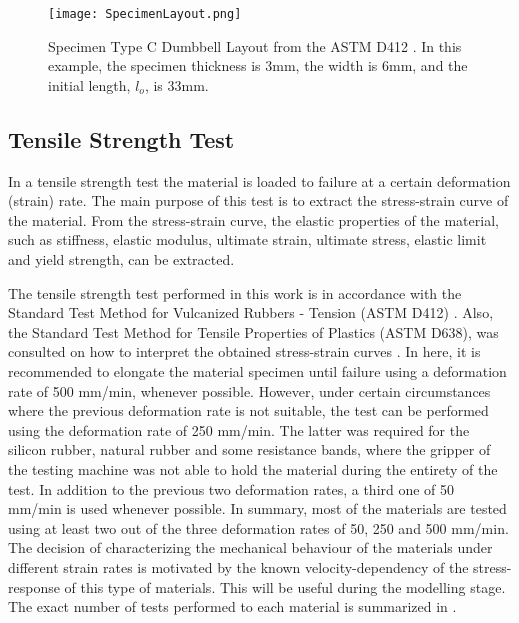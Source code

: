 \begin{figure}[htb!]
    \centering
    \texttt{[image: SpecimenLayout.png]}
    \caption{Specimen Type C Dumbbell Layout from the ASTM D412 \cite{astmd412}. In this example, the specimen thickness is 3mm, the width is 6mm, and the initial length, $l_o$, is 33mm.}
    \label{fig:specimenLayout}
\end{figure}

\subsection{Tensile Strength Test}

In a tensile strength test the material is loaded to failure at a certain deformation (strain) rate. The main purpose of this test is to extract the stress-strain curve of the material. From the stress-strain curve, the elastic properties of the material, such as stiffness, elastic modulus, ultimate strain, ultimate stress, elastic limit and yield strength, can be extracted. 

The tensile strength test performed in this work is in accordance with the Standard Test Method for Vulcanized Rubbers - Tension (ASTM D412) \cite{astmd412}. Also, the Standard Test Method for Tensile Properties of Plastics (ASTM D638), was consulted on how to interpret the obtained stress-strain curves \cite{astmd638}. In here, it is recommended to elongate the material specimen until failure using a deformation rate of 500 mm/min, whenever possible. However, under certain circumstances where the previous deformation rate is not suitable, the test can be performed using the deformation rate of 250 mm/min. The latter was required for the silicon rubber, natural rubber and some resistance bands, where the gripper of the testing machine was not able to hold the material during the entirety of the test. In addition to the previous two deformation rates, a third one of 50 mm/min is used whenever possible. In summary, most of the materials are tested using at least two out of the three deformation rates of 50, 250 and 500 mm/min. The decision of characterizing the mechanical behaviour of the materials under different strain rates is motivated by the known velocity-dependency of the stress-response of this type of materials. This will be useful during the modelling stage. The exact number of tests performed to each material is summarized in . 

